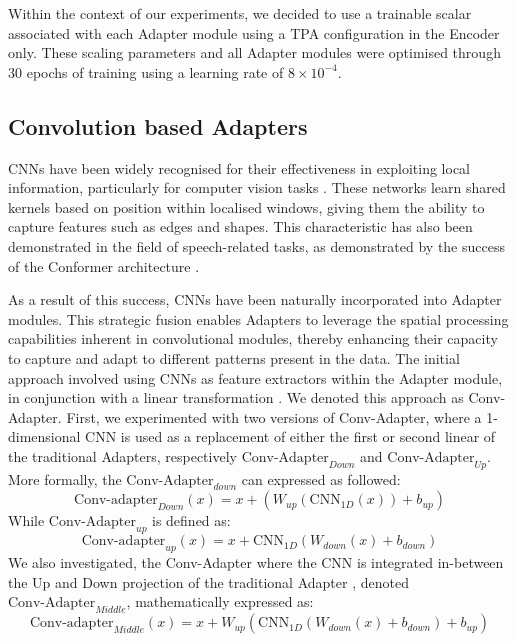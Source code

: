 Within the context of our experiments, we decided to use a trainable scalar associated with each Adapter module using a \ac{TPA} configuration in the Encoder only. These scaling parameters and all Adapter modules were optimised through 30 epochs of training using a learning rate of $8 \times 10^{-4}$.

\subsection{Convolution based Adapters}
\acp{CNN} have been widely recognised for their effectiveness in exploiting local information, particularly for computer vision tasks \cite{9879745}. These networks learn shared kernels based on position within localised windows, giving them the ability to capture features such as edges and shapes. This characteristic has also been demonstrated in the field of speech-related tasks, as demonstrated by the success of the Conformer architecture \cite{gulati2020conformer}.

As a result of this success, \acp{CNN} have been naturally incorporated into Adapter modules. This strategic fusion enables Adapters to leverage the spatial processing capabilities inherent in convolutional modules, thereby enhancing their capacity to capture and adapt to different patterns present in the data. The initial approach involved using \acp{CNN} as feature extractors within the Adapter module, in conjunction with a linear transformation \cite{yang23p_interspeech}. We denoted this approach as Conv-Adapter. First, we experimented with two versions of Conv-Adapter, where a 1-dimensional \ac{CNN} is used as a replacement of either the first or second linear of the traditional Adapters, respectively \textit{$\text{Conv-Adapter}_{Down}$} and \textit{$\text{Conv-Adapter}_{Up}$}. More formally, the \textit{$\text{Conv-Adapter}_{down}$} can expressed as followed:
\begin{equation}
    \text{Conv-adapter}_{Down}(x) = x + (W_{up}(\text{CNN}_{1D}(x))+ b_{up})
\end{equation}
While \textit{$\text{Conv-Adapter}_{up}$} is defined as:
\begin{equation}
    \text{Conv-adapter}_{up}(x) = x + \text{CNN}_{1D}(W_{down}(x)+ b_{down})
\end{equation}
We also investigated, the Conv-Adapter where the \ac{CNN} is integrated in-between the Up and Down projection of the traditional Adapter \cite{muthuchamyselvaraj23_interspeech}, denoted \textit{$\text{Conv-Adapter}_{Middle}$}, mathematically expressed as:
\begin{equation}
    \text{Conv-adapter}_{Middle}(x) = x + W_{up}(\text{CNN}_{1D}(W_{down}(x)+ b_{down})+ b_{up})
\end{equation}

